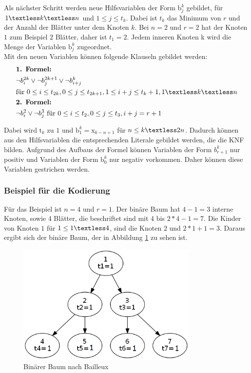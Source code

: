 \documentclass[a4,abstract=on]{scrartcl}
\begin{document}
Als nächster Schritt werden neue Hilfsvariablen der Form $\text{b}_j^k$ gebildet, für $1 \textless k \textless n$ und  $1 \leq j \leq t_k$. Dabei ist $t_k$ das Minimum von $r$ und der Anzahl der Blätter unter dem Knoten $k$. Bei $n=2$ und $r=2$ hat der Knoten $1$ zum Beispiel $2$ Blätter, daher ist $t_1=2$. Jedem inneren Knoten k wird die Menge der Variablen $\text{b}_j^k$ zugeordnet.\\
Mit den neuen Variablen können folgende Klauseln gebildet werden:\\
\begin{align*}
&\textbf{1. Formel:}\\
&\neg b_i^{2k} \vee \neg b_j^{2k+1} \vee \neg b_{i+j}^{k} \\
&\text{für} {~} 0\leq i \leq t_{2k}, 0\leq j \leq t_{2k+1}, 1\leq i+j \leq t_{k}+1, 1\textless k \textless n\\
&\textbf{2. Formel:}\\
&\neg b_i^2 \vee \neg b_j^3 {~} \text{für} {~} 0\leq i \leq t_2, 0\leq j \leq t_3, i+j = r+1\\
\end{align*}

Dabei wird $\text{t}_k$ zu $1$ und $\text{b}_1^k = \text{x}_{k-n+1}$ für $n \leq k \textless 2n$. Dadurch können aus den Hilfsvariablen die entsprechenden Literale gebildet werden, die die KNF bilden.
Aufgrund des Aufbaus der Formel können Variablen der Form $b_{r+1}^k$ nur positiv und Variablen der Form $\text{b}_0^k$ nur negativ vorkommen. Daher können diese Variablen gestrichen werden.

\subsubsection*{Beispiel für die Kodierung}
Für das Beispiel ist $n=4$ und $r =1$. Der binäre Baum hat $4-1 = 3$ interne Knoten, sowie 4 Blätter, die beschriftet sind mit $4$ bis $2*4-1=7$. Die Kinder von Knoten $1$  für $1 \leq 1 \textless 4$, sind die Knoten $2$ und $2*1 +1=3$. Daraus ergibt sich der binäre Baum, der in Abbildung \ref{fig:baum} zu sehen ist.

\begin{figure}[H]
\centering
\includegraphics[width=9cm]{bailleux.png}
\caption{Binärer Baum nach Bailleux}
\label{fig:baum}
\end{figure}
\end{document}
